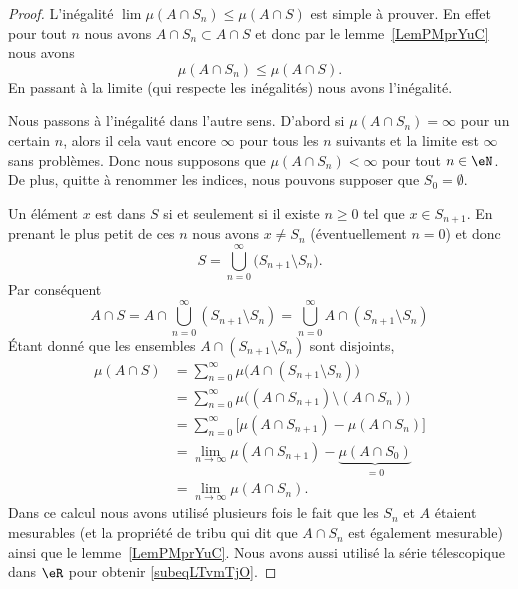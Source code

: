 \begin{proof}
    L'inégalité \( \lim\mu(A\cap S_n)\leq \mu(A\cap S)\) est simple à prouver. En effet pour tout \( n\) nous avons \( A\cap S_n\subset A\cap S\) et donc par le lemme~\ref{LemPMprYuC} nous avons
    \begin{equation}
        \mu(A\cap S_n)\leq\mu(A\cap S).
    \end{equation}
    En passant à la limite (qui respecte les inégalités) nous avons l'inégalité.

    Nous passons à l'inégalité dans l'autre sens. D'abord si \( \mu(A\cap S_n)=\infty\) pour un certain \( n\), alors il cela vaut encore \( \infty\) pour tous les \( n\) suivants et la limite est \( \infty\) sans problèmes. Donc nous supposons que \( \mu(A\cap S_n)<\infty\) pour tout \( n\in \eN\). De plus, quitte à renommer les indices, nous pouvons supposer que \( S_0=\emptyset\).

    Un élément \( x\) est dans \( S\) si et seulement si il existe \( n\geq 0\) tel que \( x\in S_{n+1}\). En prenant le plus petit de ces \( n\) nous avons \( x\neq S_n\) (éventuellement \( n=0\)) et donc
    \begin{equation}
        S=\bigcup_{n=0}^{\infty}\big( S_{n+1}\setminus S_n \big).
    \end{equation}
    Par conséquent
    \begin{equation}
            A\cap S=A\cap\bigcup_{n=0}^{\infty}(S_{n+1}\setminus S_n)
            =\bigcup_{n=0}^{\infty}A\cap(S_{n+1}\setminus S_n)
    \end{equation}
    Étant donné que les ensembles \( A\cap(S_{n+1}\setminus S_n)\) sont disjoints,
    \begin{subequations}
        \begin{align}
            \mu(A\cap S)&=\sum_{n=0}^{\infty}\mu\big( A\cap(S_{n+1}\setminus S_n) \big)\\
            &=\sum_{n=0}^{\infty}\mu\Big( (A\cap S_{n+1})\setminus (A\cap S_n) \Big)\\
            &=\sum_{n=0}^{\infty}\big[ \mu(A\cap S_{n+1})-\mu(A\cap S_n) \big]\\
            &=\lim_{n\to \infty} \mu(A\cap S_{n+1})-\underbrace{\mu(A\cap S_0)}_{=0}\label{subeqLTvmTjO}\\
            &=\lim_{n\to \infty} \mu(A\cap S_n).
        \end{align}
    \end{subequations}
    Dans ce calcul nous avons utilisé plusieurs fois le fait que les \( S_n\) et \( A\) étaient mesurables (et la propriété de tribu qui dit que \( A\cap S_n\) est également mesurable) ainsi que le lemme~\ref{LemPMprYuC}. Nous avons aussi utilisé la série télescopique dans \( \eR\) pour obtenir \eqref{subeqLTvmTjO}.
\end{proof}

